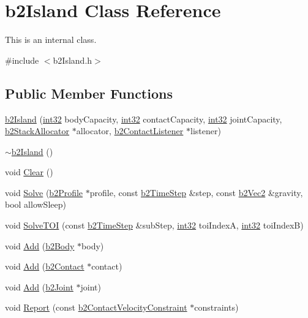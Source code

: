 \hypertarget{classb2_island}{}\section{b2\+Island Class Reference}
\label{classb2_island}


This is an internal class.  




{\ttfamily \#include $<$b2\+Island.\+h$>$}

\subsection*{Public Member Functions}
\begin{DoxyCompactItemize}
\item 
\mbox{\hyperlink{classb2_island_a2f2258f09d2663dcb35a1d69d16896cb}{b2\+Island}} (\mbox{\hyperlink{b2_settings_8h_a43d43196463bde49cb067f5c20ab8481}{int32}} body\+Capacity, \mbox{\hyperlink{b2_settings_8h_a43d43196463bde49cb067f5c20ab8481}{int32}} contact\+Capacity, \mbox{\hyperlink{b2_settings_8h_a43d43196463bde49cb067f5c20ab8481}{int32}} joint\+Capacity, \mbox{\hyperlink{classb2_stack_allocator}{b2\+Stack\+Allocator}} $\ast$allocator, \mbox{\hyperlink{classb2_contact_listener}{b2\+Contact\+Listener}} $\ast$listener)
\item 
\mbox{\hyperlink{classb2_island_a87b39bdaab4f98acca77dd39d157a0e8}{$\sim$b2\+Island}} ()
\item 
void \mbox{\hyperlink{classb2_island_a26566f7388fcaf7523446e5e76d99c4d}{Clear}} ()
\item 
void \mbox{\hyperlink{classb2_island_a28a6f74174cde3a6e93663c740f418fa}{Solve}} (\mbox{\hyperlink{structb2_profile}{b2\+Profile}} $\ast$profile, const \mbox{\hyperlink{structb2_time_step}{b2\+Time\+Step}} \&step, const \mbox{\hyperlink{structb2_vec2}{b2\+Vec2}} \&gravity, bool allow\+Sleep)
\item 
void \mbox{\hyperlink{classb2_island_a61f577b473962bb0d8add1f55eeef7ee}{Solve\+T\+OI}} (const \mbox{\hyperlink{structb2_time_step}{b2\+Time\+Step}} \&sub\+Step, \mbox{\hyperlink{b2_settings_8h_a43d43196463bde49cb067f5c20ab8481}{int32}} toi\+IndexA, \mbox{\hyperlink{b2_settings_8h_a43d43196463bde49cb067f5c20ab8481}{int32}} toi\+IndexB)
\item 
void \mbox{\hyperlink{classb2_island_af2d54861bd063051c0a6dc5f73b27c3e}{Add}} (\mbox{\hyperlink{classb2_body}{b2\+Body}} $\ast$body)
\item 
void \mbox{\hyperlink{classb2_island_abc0ea9208e818b551404fd507f197a51}{Add}} (\mbox{\hyperlink{classb2_contact}{b2\+Contact}} $\ast$contact)
\item 
void \mbox{\hyperlink{classb2_island_a04e6ccd0c11f6ef5a7ed0a926d081445}{Add}} (\mbox{\hyperlink{classb2_joint}{b2\+Joint}} $\ast$joint)
\item 
void \mbox{\hyperlink{classb2_island_a57620f76faf000f61c76e925e40e6129}{Report}} (const \mbox{\hyperlink{structb2_contact_velocity_constraint}{b2\+Contact\+Velocity\+Constraint}} $\ast$constraints)
\end{DoxyCompactItemize}
